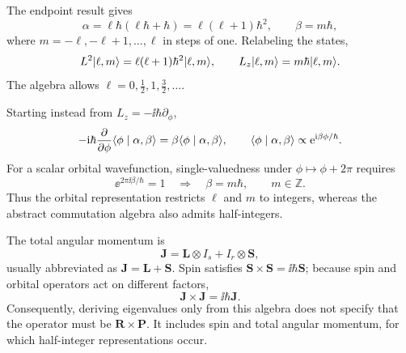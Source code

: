 The endpoint result gives
\[
 \alpha=\ell\hbar(\ell\hbar+\hbar)=\ell(\ell+1)\hbar^2,
 \qquad \beta=m\hbar,
\]
where $m=-\ell,-\ell+1,\ldots,\ell$ in steps of one. Relabeling the states,
\[
 L^2\lvert \ell,m\rangle=\ell(\ell+1)\hbar^2\lvert \ell,m\rangle,\qquad
 L_z\lvert \ell,m\rangle=m\hbar\lvert \ell,m\rangle.
\]
The algebra allows $\ell=0,\tfrac12,1,\tfrac32,\ldots$.

Starting instead from $L_z=-\ii\hbar\partial_\phi$,
\[
 -\mathrm{i}\hbar\frac{\partial}{\partial\phi}
 \langle \phi\mid \alpha,\beta\rangle
 =\beta\langle \phi\mid \alpha,\beta\rangle,
 \qquad
 \langle \phi\mid \alpha,\beta\rangle\propto\mathrm{e}^{\mathrm{i}\beta\phi/\hbar}.
\]
For a scalar orbital wavefunction, single-valuedness under
$\phi\mapsto\phi+2\pi$ requires
\[
 \ee^{2\pi\ii\beta/\hbar}=1\quad\Longrightarrow\quad
 \beta=m\hbar,\qquad m\in\mathbb Z.
\]
Thus the orbital representation restricts $\ell$ and $m$ to integers,
whereas the abstract commutation algebra also admits half-integers.

The total angular momentum is
\[
 \mathbf J=\mathbf L\otimes I_s+I_r\otimes\mathbf S,
\]
usually abbreviated as $\mathbf J=\mathbf L+\mathbf S$.
Spin satisfies $\mathbf S\times\mathbf S=\ii\hbar\mathbf S$;
because spin and orbital operators act on different factors,
\[
 \mathbf J\times\mathbf J=\ii\hbar\mathbf J.
\]
Consequently, deriving eigenvalues only from this algebra does not
specify that the operator must be $\mathbf R\times\mathbf P$.
It includes spin and total angular momentum, for which half-integer
representations occur.
